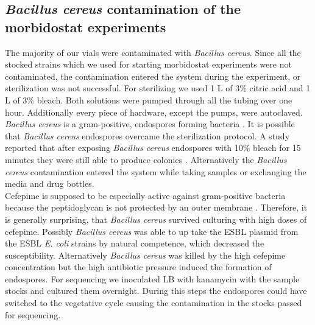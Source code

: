 \subsection{\textit{Bacillus cereus} contamination of the morbidostat experiments}
The majority of our vials were contaminated with \textit{Bacillus cereus}. Since all the stocked strains which we used for starting morbidostat experiments were not contaminated, the contamination entered the system during the experiment, or sterilization was not successful. For sterilizing we used 1 L of 3\% citric acid and 1 L of 3\% bleach. Both solutions were pumped through all the tubing over one hour. Additionally every piece of hardware, except the pumps, were autoclaved. \textit{Bacillus cereus} is a gram-positive, endospores forming bacteria \cite{bintsis_foodborne_2017}. It is possible that \textit{Bacillus cereus} endospores overcame the sterilization protocol. A study reported that after exposing \textit{Bacillus cereus} endospores with 10\% bleach for 15 minutes they were still able to produce colonies \cite{robertson_effect_2018}. Alternatively the \textit{Bacillus cereus} contamination entered the system while taking samples or exchanging the media and drug bottles. \\
Cefepime is supposed to be especially active against gram-positive bacteria because the peptidoglycan is not protected by an outer membrane \cite{sykes_chapter_2014}. Therefore, it is generally surprising, that \textit{Bacillus cereus} survived culturing with high doses of cefepime. Possibly \textit{Bacillus cereus} was able to up take the ESBL plasmid from the ESBL \textit{E. coli} strains by natural competence, which decreased the susceptibility. Alternatively \textit{Bacillus cereus} was killed by the high cefepime concentration but the high antibiotic pressure induced the formation of endospores. For sequencing we inoculated LB with kanamycin with the sample stocks and cultured them overnight. During this steps the endospores could have switched to the vegetative cycle causing the contamination in the stocks passed for sequencing.


